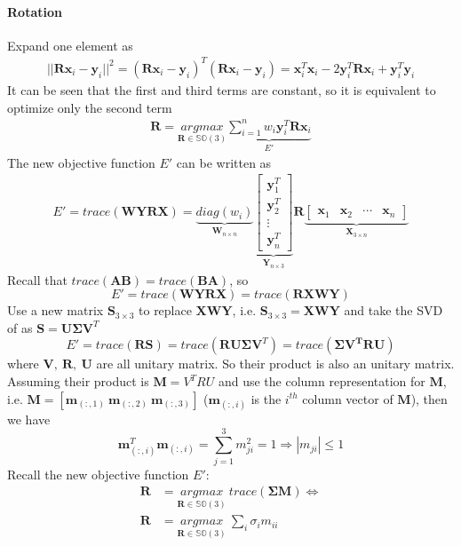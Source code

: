 \documentclass[a4paper]{report}
\begin{document}
\paragraph{Rotation}
Expand one element as
\begin{align*}
||\mathbf{R}\mathbf{x}_i-\mathbf{y}_i||^2=(\mathbf{R}\mathbf{x}_i-\mathbf{y}_i)^{T}(\mathbf{R}\mathbf{x}_i-\mathbf{y}_i)=\mathbf{x}_i^T\mathbf{x}_i-2\mathbf{y}_i^T\mathbf{Rx}_i+\mathbf{y}_i^T\mathbf{y}_i
\end{align*}
It can be seen that the first and third terms are constant, so it is equivalent to optimize only the second term
\begin{align*}
\mathbf{R}=\underset{\mathbf{R}\in\mathbb{SO}(3)}{argmax} \underbrace{\sum_{i=1}^{n} w_i\mathbf{y}_i^T\mathbf{Rx}_i}_{E'}
\end{align*}
The new objective function $E'$ can be written as
\begin{align*}
E'=trace(\mathbf{WYRX})=\underbrace{diag(w_i)}_{\mathbf{W}_{n\times n}} \underbrace{\left[
\begin{matrix}
\mathbf{y}_1^T \\
\mathbf{y}_2^T \\
\vdots \\
\mathbf{y}_n^T 
\end{matrix}
\right]}_{\mathbf{Y}_{n \times 3}} \mathbf{R} 
\underbrace{\left[
	\begin{matrix}
	\mathbf{x}_1 & \mathbf{x}_2 & \cdots & \mathbf{x}_n 
	\end{matrix}
	\right]}_{\mathbf{X}_{3 \times n}}
\end{align*}
Recall that $trace({\mathbf{AB}})=trace({\mathbf{BA}})$, so 
$$
E'=trace(\mathbf{WYRX})=trace(\mathbf{RXWY})
$$
Use a new matrix $\mathbf{S}_{3 \times 3}$ to replace $\mathbf{XWY}$, i.e. $\mathbf{S}_{3 \times 3} =\mathbf{XWY}$ and take the SVD of as $\mathbf{S}=\mathbf{U\Sigma V}^T$
$$
E'=trace(\mathbf{RS})=trace(\mathbf{RU\Sigma V}^T)=trace(\mathbf{\Sigma V^TRU})
$$
where $\mathbf{V},\ \mathbf{R},\ \mathbf{U}$ are all unitary matrix. So their product is also an unitary matrix. Assuming their product is $\mathbf{M}=V^TRU$ and use the column representation for $\mathbf{M}$, i.e. $\mathbf{M}=[\mathbf{m}_{(:,1)}\ \mathbf{m}_{(:,2)}\ \mathbf{m}_{(:,3)}]$ ($\mathbf{m}_{(:,i)}$ is the $i^{th}$ column vector of $\mathbf{M}$), then we have
$$
\mathbf{m}_{(:,i)}^T\mathbf{m}_{(:,i)} = \sum_{j=1}^{3} m_{ji}^2 = 1 \Rightarrow |m_{ji}|\leq 1
$$
Recall the new objective function $E'$:
\begin{align*}
\mathbf{R}&=\underset{\mathbf{R}\in\mathbb{SO}(3)}{argmax}\ trace(\mathbf{\Sigma M}) \Leftrightarrow \\
\mathbf{R}&=\underset{\mathbf{R}\in\mathbb{SO}(3)}{argmax}\ \sum_{i} \sigma_i m_{ii}
\end{align*}
\end{document}
